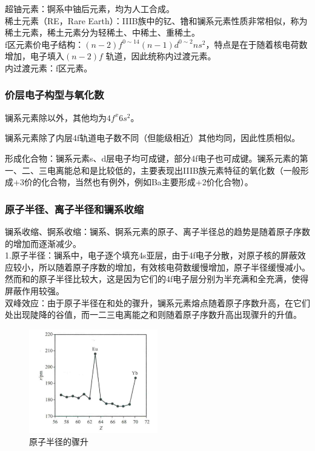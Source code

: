 \documentclass[a4paper,UTF8]{article}
\begin{document}
超铀元素：锕系中铀后元素，均为人工合成。\\

稀土元素（RE，Rare Earth）：IIIB族中的钇、镥和镧系元素性质非常相似，称为稀土元素，稀土元素分为轻稀土、中稀土、重稀土。\\

f区元素价电子结构：$ (n-2)f^{0\sim 14} (n-1)d^{0\sim 2} ns^2 $，特点是在于随着核电荷数增加，电子填入$ (n-2)f $ 轨道，因此统称内过渡元素。\\

内过渡元素：f区元素。\\

\subsubsection{价层电子构型与氧化数}

镧系元素除以外，其他均为$ 4f^x6s^2 $。

镧系元素除了内层4f轨道电子数不同（但能级相近）其他均同，因此性质相似。

形成化合物：镧系元素s、d层电子均可成键，部分4f电子也可成键。镧系元素的第一、二、三电离能总和是比较低的，主要表现出IIIB族元素特征的氧化数（一般形成+3价的化合物，当然也有例外，例如Ba主要形成+2价化合物）。

\subsubsection{原子半径、离子半径和镧系收缩}

镧系收缩、锕系收缩：镧系、锕系元素的原子、离子半径总的趋势是随着原子序数的增加而逐渐减少。\\

1.原子半径：镧系中，电子逐个填充4s亚层，由于4f电子分散，对原子核的屏蔽效应较小，所以随着原子序数的增加，有效核电荷数缓慢增加，原子半径缓慢减小。然而和的原子半径比较大，这是因为它们的4f电子层分别为半充满和全充满，使得屏蔽作用较强。\\

双峰效应：由于原子半径在和处的骤升，镧系元素熔点随着原子序数升高，在它们处出现陡降的谷值，而一二三电离能之和则随着原子序数升高出现骤升的升值。\\

\begin{figure}[htpb]
	\centering
	\includegraphics[width=0.5\textwidth]{figure//双峰效应1.png}
	\caption{原子半径的骤升}
	\label{fig:}
\end{figure}
\end{document}
